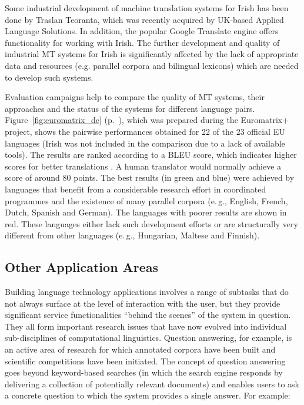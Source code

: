 \begin{multicols}{2}
Some industrial development of machine translation systems for Irish has been done by Traslan Teoranta, which was recently acquired by UK-based Applied Language Solutions. In addition, the popular Google Translate engine offers functionality for working with Irish. The further development and quality of industrial MT systems for Irish is significantly affected by the lack of appropriate data and resources (e.g. parallel corpora and bilingual lexicons) which are needed to develop such systems.

Evaluation campaigns help to compare the quality of MT systems, their approaches and the status of the systems for different language pairs. Figure~\ref{fig:euromatrix_de} (p.~\pageref{fig:euromatrix_de}), which was prepared during the Euromatrix+ project, shows the pairwise performances obtained for 22 of the 23 official EU languages (Irish was not included in the comparison due to a lack of available tools). The results are ranked according to a BLEU score, which indicates higher scores for better translations \cite{bleu1}. A human translator would normally achieve a score of around 80 points. The best results (in green and blue) were achieved by languages that benefit from a considerable research effort in coordinated programmes and the existence of many parallel corpora (e.\,g., English, French, Dutch, Spanish and German). The languages with poorer results are shown in red. These languages either lack such development efforts or are structurally very different from other languages (e.\,g., Hungarian, Maltese and Finnish).

\subsection{Other Application Areas}

Building language technology applications involves a range of subtasks that do not always surface at the level of interaction with the user, but they provide significant service functionalities ``behind the scenes'' of the system in question. They all form important research issues that have now evolved into individual sub-disciplines of computational linguistics. Question answering, for example, is an active area of research for which annotated corpora have been built and scientific competitions have been initiated. The concept of question answering goes beyond keyword-based searches (in which the search engine responds by delivering a collection of potentially relevant documents) and enables users to ask a concrete question to which the system provides a single answer. For example:


\end{multicols}
